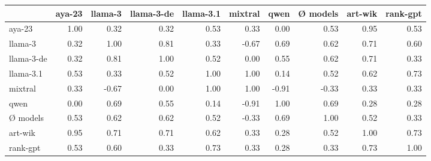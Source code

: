 \begin{tabular}{lrrrrrrrrr}
\toprule
 & aya-23 & llama-3 & llama-3-de & llama-3.1 & mixtral & qwen & Ø models & art-wik & rank-gpt \\
\midrule
aya-23 & 1.00 & 0.32 & 0.32 & 0.53 & 0.33 & 0.00 & 0.53 & 0.95 & 0.53 \\
llama-3 & 0.32 & 1.00 & 0.81 & 0.33 & -0.67 & 0.69 & 0.62 & 0.71 & 0.60 \\
llama-3-de & 0.32 & 0.81 & 1.00 & 0.52 & 0.00 & 0.55 & 0.62 & 0.71 & 0.33 \\
llama-3.1 & 0.53 & 0.33 & 0.52 & 1.00 & 1.00 & 0.14 & 0.52 & 0.62 & 0.73 \\
mixtral & 0.33 & -0.67 & 0.00 & 1.00 & 1.00 & -0.91 & -0.33 & 0.33 & 0.33 \\
qwen & 0.00 & 0.69 & 0.55 & 0.14 & -0.91 & 1.00 & 0.69 & 0.28 & 0.28 \\
Ø models & 0.53 & 0.62 & 0.62 & 0.52 & -0.33 & 0.69 & 1.00 & 0.52 & 0.33 \\
art-wik & 0.95 & 0.71 & 0.71 & 0.62 & 0.33 & 0.28 & 0.52 & 1.00 & 0.73 \\
rank-gpt & 0.53 & 0.60 & 0.33 & 0.73 & 0.33 & 0.28 & 0.33 & 0.73 & 1.00 \\
\bottomrule
\end{tabular}
